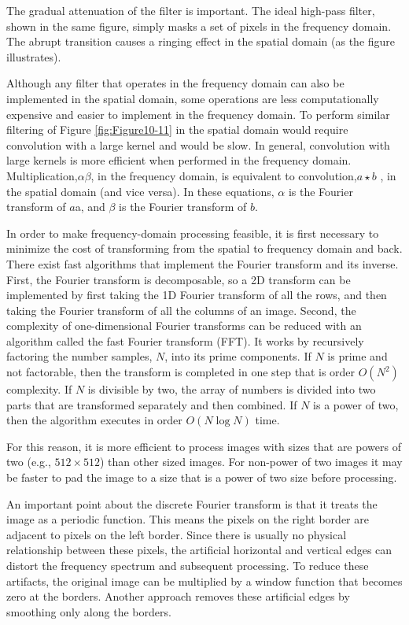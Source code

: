The gradual attenuation of the filter is important. The ideal high-pass filter, shown in the same figure, simply masks a set of pixels in the frequency domain. The abrupt transition causes a ringing effect in the spatial domain (as the figure illustrates).

Although any filter that operates in the frequency domain can also be implemented in the spatial domain, some operations are less computationally expensive and easier to implement in the frequency domain. To perform similar filtering of Figure \ref{fig:Figure10-11} in the spatial domain would require convolution with a large kernel and would be slow. In general, convolution with large kernels is more efficient when performed in the frequency domain. Multiplication,$\alpha \beta$, in the frequency domain, is equivalent to convolution,$a \star b$ , in the spatial domain (and vice versa). In these equations, $\alpha$ is the Fourier transform of $a$a, and $\beta$ is the Fourier transform of $b$.

In order to make frequency-domain processing feasible, it is first necessary to minimize the cost of transforming from the spatial to frequency domain and back. There exist fast algorithms that implement the Fourier transform and its inverse. First, the Fourier transform is decomposable, so a 2D transform can be implemented by first taking the 1D Fourier transform of all the rows, and then taking the Fourier transform of all the columns of an image. Second, the complexity of one-dimensional Fourier transforms can be reduced with an algorithm called the fast Fourier transform (FFT). It works by recursively factoring the number samples, $N$, into its prime components. If $N$ is prime and not factorable, then the transform is completed in one step that is order $O(N^2)$ complexity. If $N$ is divisible by two, the array of numbers is divided into two parts that are transformed separately and then combined. If $N$ is a power of two, then the algorithm executes in order $O(N \log N)$ time.

For this reason, it is more efficient to process images with sizes that are powers of two (e.g., $512 \times 512$) than other sized images. For non-power of two images it may be faster to pad the image to a size that is a power of two size before processing.

An important point about the discrete Fourier transform is that it treats the image as a periodic function. This means the pixels on the right border are adjacent to pixels on the left border. Since there is usually no physical relationship between these pixels, the artificial horizontal and vertical edges can distort the frequency spectrum and subsequent processing. To reduce these artifacts, the original image can be multiplied by a window function that becomes zero at the borders. Another approach removes these artificial edges by smoothing only along the borders.


